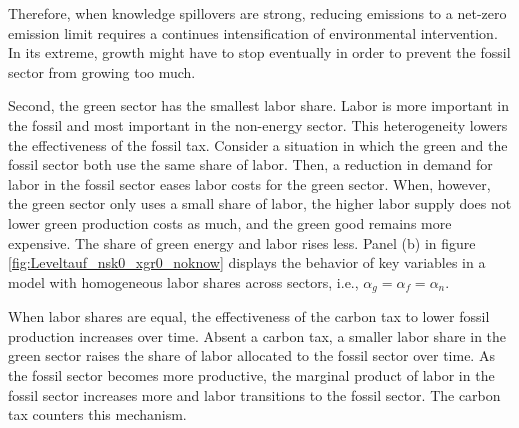 Therefore, when knowledge spillovers are strong, reducing emissions to a net-zero emission limit requires a continues intensification of environmental intervention. In its extreme, growth might have to stop eventually in order to prevent the fossil sector from growing too much.

Second, the green sector has the smallest labor share. Labor is more important in the fossil and most important in the non-energy sector. This heterogeneity lowers the effectiveness of the fossil tax. 
Consider a situation in which the green and the fossil sector both use the same share of labor. Then, a reduction in demand for labor in the fossil sector eases labor costs for the green sector. When, however, the green sector only uses a small share of labor, the higher labor supply does not lower green production costs as much, and the green good remains more expensive. The share of green energy and labor rises less. Panel (b)  in figure \ref{fig:Leveltauf_nsk0_xgr0_noknow} displays the behavior of key variables in a model with homogeneous labor shares across sectors, i.e., $\alpha_g=\alpha_f=\alpha_n$. 

When labor shares are equal, the effectiveness of the carbon tax to lower fossil production increases over time. 
Absent a carbon tax, a smaller labor share in the green sector raises the share of labor allocated to the fossil sector over time. As the fossil sector becomes more productive, the marginal product of labor in the fossil sector increases more and labor transitions to the fossil sector. The carbon tax counters this mechanism. %




